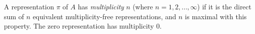 A representation $\pi$ of $A$ has \emph{multiplicity} $n$ (where $n = 1, 2, \ldots, \infty$) if it is the direct sum of $n$ equivalent multiplicity-free representations, and $n$ is maximal with this property. The zero representation has multiplicity $0$.

